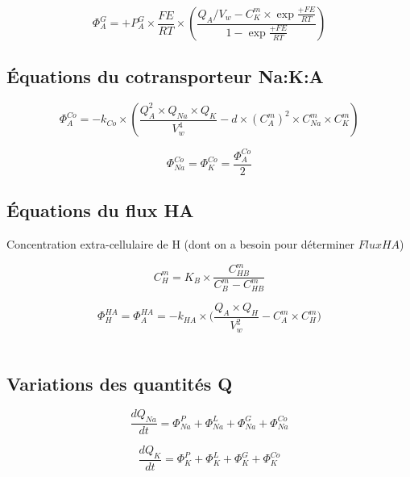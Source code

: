 \documentclass[a4paper,fleqn]{article}
\begin{document}
\begin{equation}
\Phi_{A}^{G}={+P_{A}^{G}}\times{\frac{FE}{RT}}\times{\left(\frac{Q_{A}/V_w-{C_{K}^{m}}\times{\exp{\frac{+FE}{RT}}}}{1 - \exp{\frac{+FE}{RT}}}\right)}
\end{equation}

\subsection{Équations du cotransporteur Na:K:A}

\begin{equation}
\Phi_{A}^{Co}={-k_{Co}}\times{\left(\frac{{Q_{A}^2}\times{Q_{Na}}\times{Q_{K}}}{V_w^4}-{d}\times{\left(C_{A}^{m}\right)^2}\times{C_{Na}^{m}}\times{C_{K}^{m}}\right)}
\end{equation}

\begin{equation}
\Phi_{Na}^{Co}=\Phi_{K}^{Co}=\frac{\Phi_{A}^{Co}}{2}
\end{equation}

\subsection{Équations du flux HA}

Concentration extra-cellulaire de H (dont on a besoin pour déterminer $FluxHA$)

\begin{equation}
C_{H}^{m}={K_B}\times{\frac{C_{HB}^{m}}{C_{B}^{m}-C_{HB}^{m}}}
\end{equation}

\begin{equation}
\Phi_{H}^{HA}=\Phi_{A}^{HA}={-k_{HA}}\times{( \frac{{Q_A}\times{Q_H}}{V_w^2} - {C_{A}^{m}}\times{C_{H}^{m}}})
\end{equation}\\


\subsection{Variations des quantités Q}

\begin{equation}
\frac{dQ_{Na}}{dt}=\Phi_{Na}^{P}+\Phi_{Na}^{L}+\Phi_{Na}^{G}+\Phi_{Na}^{Co}
\end{equation}

\begin{equation}
\frac{dQ_K}{dt}=\Phi_{K}^{P}+\Phi_{K}^{L}+\Phi_{K}^{G}+\Phi_{K}^{Co}
\end{equation}
\end{document}
